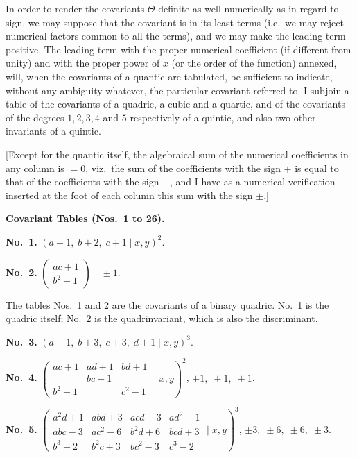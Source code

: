\documentclass[11pt]{article}
\begin{document}
In order to render the covariants $\Theta$ definite as well numerically as in regard to sign, we may suppose that the covariant is in its least terms (i.e.\ we may reject numerical factors common to all the terms), and we may make the leading term positive. The leading term with the proper numerical coefficient (if different from unity) and with the proper power of $x$ (or the order of the function) annexed, will, when the covariants of a quantic are tabulated, be sufficient to indicate, without any ambiguity whatever, the particular covariant referred to. I subjoin a table of the covariants of a quadric, a cubic and a quartic, and of the covariants of the degrees $1, 2, 3, 4$ and $5$ respectively of a quintic, and also two other invariants of a quintic.

[Except for the quantic itself, the algebraical sum of the numerical coefficients in any column is $=0$, viz.\ the sum of the coefficients with the sign $+$ is equal to that of the coefficients with the sign $-$, and I have as a numerical verification inserted at the foot of each column this sum with the sign $\pm$.]

\bigskip
\begin{center}\textbf{Covariant Tables (Nos.\ 1 to 26).}\end{center}

\medskip
\noindent\textbf{No.~1.} \quad $(a+1,\; b+2,\; c+1 \mid x, y)^2$.

\medskip
\noindent\textbf{No.~2.} \quad
$\begin{pmatrix} ac + 1 \\ b^2 - 1 \end{pmatrix}\quad \pm 1$.

\medskip
The tables Nos.~1 and 2 are the covariants of a binary quadric. No.~1 is the quadric itself; No.~2 is the quadrinvariant, which is also the discriminant.

\medskip
\noindent\textbf{No.~3.} \quad $(a+1,\; b+3,\; c+3,\; d+1 \mid x, y)^3$.

\medskip
\noindent\textbf{No.~4.} \quad
$\left(\begin{array}{ccc}
ac+1 & ad+1 & bd+1 \\
     & bc-1 &      \\
b^2-1 &      & c^2-1
\end{array} \mid x, y\right)^2$, \quad $\pm 1,\;\pm 1,\;\pm 1$.

\medskip
\noindent\textbf{No.~5.} \quad
$\left(\begin{array}{cccc}
a^2 d + 1 & abd + 3 & acd - 3 & ad^2 - 1 \\
abc - 3   & ac^2 - 6 & b^2 d + 6 & bcd + 3 \\
b^3 + 2   & b^2 c + 3 & bc^2 - 3 & c^3 - 2
\end{array} \mid x, y\right)^3$, \quad $\pm 3,\;\pm 6,\;\pm 6,\;\pm 3$.
\end{document}
